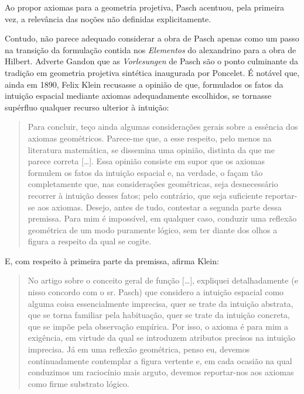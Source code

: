 \documentclass{hipatia}
\begin{document}
Ao propor axiomas para a geometria projetiva, Pasch acentuou, pela primeira vez, a relevância das noções não definidas explicitamente. \cite[p. 859]{kleiner1999}

Contudo, não parece adequado considerar a obra de Pasch apenas como um passo na transição da formulação contida nos \emph{Elementos} do alexandrino para a obra de Hilbert. Adverte Gandon que as \emph{Vorlesungen} de Pasch são o ponto culminante da tradição em geometria projetiva sintética inaugurada por Poncelet.  \cite[p. 655--656]{gandon2005}                                                                                                             
É notável que, ainda em 1890, Felix Klein recusasse a opinião de que, formulados os fatos da intuição espacial mediante axiomas adequadamente escolhidos, se tornasse supérfluo qualquer recurso ulterior à intuição:
\begin{quote}
Para concluir, teço ainda algumas considerações gerais sobre a essência dos axiomas geométricos. Parece-me que, a esse respeito, pelo menos na literatura matemática, se dissemina uma opinião, distinta da que me parece correta [\dots]. Essa opinião consiste em supor que os axiomas formulem os fatos da intuição espacial e, na verdade, o façam tão completamente que, nas considerações geométricas, seja desnecessário recorrer à intuição desses fatos; pelo contrário, que seja suficiente reportar-se aos axiomas. Desejo, antes de tudo, contestar a segunda parte dessa premissa. Para mim é impossível, em qualquer caso, conduzir uma reflexão geométrica de um modo puramente lógico, sem ter diante dos olhos a figura a respeito da qual se cogite.  \cite[p. 380--381]{klein1890}
\end{quote}

E, com respeito à primeira parte da premissa, afirma Klein: 
\begin{quote}
No artigo sobre o conceito geral de função [\dots], expliquei detalhadamente (e nisso concordo com o sr. Pasch) que considero a intuição espacial como alguma coisa essencialmente imprecisa, quer se trate da intuição abstrata, que se torna familiar pela habituação, quer se trate da intuição concreta, que se impõe pela observação empírica. Por isso, o axioma é para mim a exigência, em virtude da qual se introduzem atributos precisos na intuição imprecisa. Já em uma reflexão geométrica, penso eu, devemos continuadamente contemplar a figura vertente e, em cada ocasião na qual conduzimos um raciocínio mais arguto, devemos reportar-nos aos axiomas como firme substrato lógico. \cite[p. 381]{klein1890}  
\end{quote}
\end{document}
